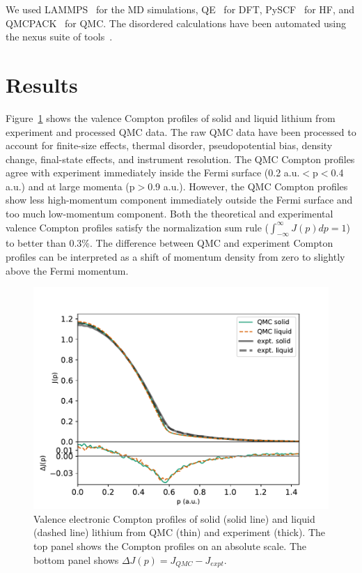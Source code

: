 We used LAMMPS~\cite{Plimpton1995} for the MD simulations, QE~\cite{Giannozzi2009,Giannozzi2017} for DFT, PySCF~\cite{PYSCF} for HF, and QMCPACK~\cite{Kim2018} for QMC. The disordered calculations have been automated using the nexus suite of tools~\cite{Krogel2016}.

\section{Results} \label{sec:results}

Figure~\ref{fig:sl-jp-djp} shows the valence Compton profiles of solid and liquid lithium from experiment and processed QMC data. The raw QMC data have been processed to account for finite-size effects, thermal disorder, pseudopotential bias, density change, final-state effects, and instrument resolution. The QMC Compton profiles agree with experiment immediately inside the Fermi surface (0.2 a.u.$<$p$<$0.4 a.u.) and at large momenta (p$>$0.9  a.u.). However, the QMC Compton profiles show less high-momentum component immediately outside the Fermi surface and too much low-momentum component. Both the theoretical and experimental valence Compton profiles satisfy the normalization sum rule ($\int_{-\infty}^{\infty} J(p)dp=1$) to better than 0.3\%. The difference between QMC and experiment Compton profiles can be interpreted as a shift of momentum density from zero to slightly above the Fermi momentum. 

\begin{figure}[h]
\centering
\includegraphics[width=0.8\linewidth]{li58_sl-jp}
\caption{Valence electronic Compton profiles of solid (solid line) and liquid (dashed line) lithium from QMC (thin) and experiment (thick). The top panel shows the Compton profiles on an absolute scale. The bottom panel shows  $\Delta J(p)=J_{QMC}-J_{expt}$.}\label{fig:sl-jp-djp}
\end{figure}

